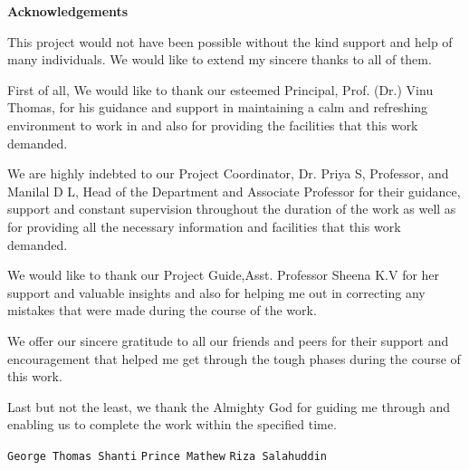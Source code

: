 \documentclass[11pt]{report}
\begin{document}
\begin{titlepage}
\vspace{.25in}	
\begin{center}
\textbf{Acknowledgements}\\
\end{center}
\normalsize

This project would not have been possible without the kind support and help of many individuals. We would like to extend my sincere thanks to all of them.
  
First of all, We would like to thank our esteemed Principal, Prof. (Dr.) Vinu Thomas, for his guidance and support in maintaining a calm and refreshing environment to work in and also for providing the facilities that this work demanded.
  
We are highly indebted to our Project Coordinator, Dr. Priya S, Professor, and Manilal D L, Head of the Department and Associate Professor for their guidance, support and constant supervision throughout the duration of the work as well as for providing all the necessary information and facilities that this work demanded.

We would like to thank our Project Guide,Asst. Professor Sheena K.V for her support and valuable insights and also for helping me out in correcting any mistakes that were made during the course of the work. 
  
We offer our sincere gratitude to all our friends and peers for their support and encouragement that helped me get through the tough phases during the course of this work.
  
Last but not the least, we thank the Almighty God for guiding me through and enabling us to complete the work within the specified time.
\vspace{.25in}

\vspace{.25in}


\flushleft \small{\texttt{George Thomas Shanti}}
\flushleft \small{\texttt{Prince Mathew}}
\flushleft \small{\texttt{Riza Salahuddin}}

\end{titlepage}
\end{document}
